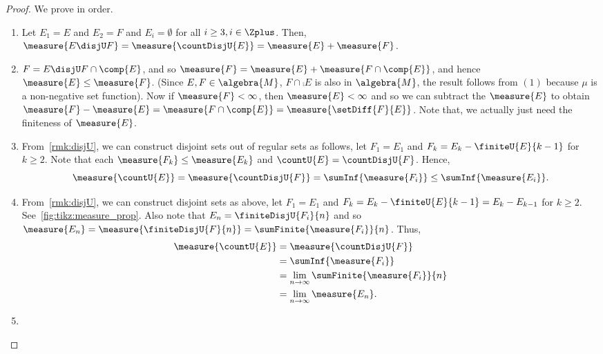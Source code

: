 \begin{proof}
    We prove in order.
    \begin{enumerate}
	\item 
	    Let $E_1 = E$ and $E_2 = F$ and $E_i = \emptyset$ for all $i \geq 3, i \in \Zplus$.
	    Then, $\measure{E\disjU F} = \measure{\countDisjU{E}} = \measure{E} + \measure{F}$.
	\item
	    $F = E \disjU F\cap\comp{E}$, and so $\measure{F} = \measure{E} +
	    \measure{F\cap\comp{E}}$, and hence $\measure{E} \leq \measure{F}$. 
	    (Since $E,F \in \algebra{M}$, $F\cap\comp{E}$ is also in
	    $\algebra{M}$, the result follows from $(1)$ because $\mu$ is a non-negative set
	    function). Now if $\measure{F} < \infty$, then $\measure{E} < \infty$ and so we can
	    subtract the $\measure{E}$ to obtain $\measure{F} - \measure{E} =
	    \measure{F\cap\comp{E}} = \measure{\setDiff{F}{E}}$. Note that, we actually just need the
	    finiteness of $\measure{E}$.
	\item 
	    From~\ref{rmk:disjU}, we can construct disjoint sets out of regular sets as follows,
	    let $F_1 = E_1$ and $F_k = E_k - \finiteU{E}{k-1}$ for $k \geq 2$. 
	    Note that each $\measure{F_k} \leq \measure{E_k}$ and $\countU{E} = \countDisjU{F}$. 
	    Hence, \[\measure{\countU{E}} = \measure{\countDisjU{F}} = \sumInf{\measure{F_i}} \leq
		\sumInf{\measure{E_i}}.\]
	\item
	   From~\ref{rmk:disjU}, we can construct disjoint sets as above, let $F_1 = E_1$ and 
	   $F_k = E_k - \finiteU{E}{k-1} = E_k - E_{k-1}$ for $k \geq 2$.
	   See~\ref{fig:tikz:measure_prop}. Also note that 
	   $E_n = \finiteDisjU{F_i}{n}$ and so $\measure{E_n} = \measure{\finiteDisjU{F}{n}} =
	   \sumFinite{\measure{F_i}}{n}$. Thus,
	   \begin{align*}
	       \measure{\countU{E}} &=\measure{\countDisjU{F}}  \\
	       &=\sumInf{\measure{F_i}} \\
	       &=\lim\limits_{n\to\infty}\sumFinite{\measure{F_i}}{n} \\
	       &=\lim\limits_{n\to\infty}\measure{E_n}. 
	   \end{align*}
	   


       \item
	   

\end{enumerate}
\end{proof}
